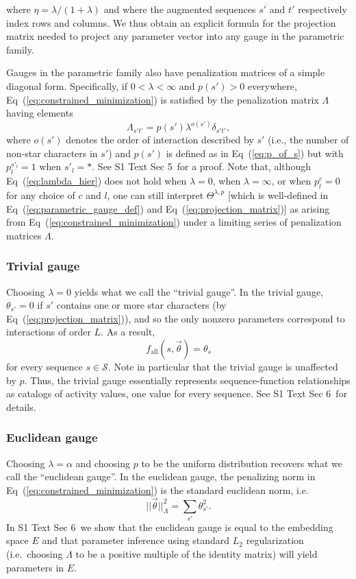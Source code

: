 \documentclass[10pt,letterpaper]{article}
\newcommand{\eq}[1]{Eq\ (\ref{#1})}
\newcommand{\si}[1]{{S1 Text Sec #1}}
\begin{document}
where $\eta = \lambda/(1+\lambda)$ and where the augmented sequences $s'$ and $t'$ respectively index rows and columns. We thus obtain an explicit formula for the projection matrix needed to project any parameter vector into any gauge in the parametric family.

Gauges in the parametric family also have penalization matrices of a simple diagonal form. Specifically, if $0 < \lambda < \infty$ and $p(s')>0$ everywhere, \eq{eq:constrained_minimization} is satisfied by the penalization matrix $\Lambda$ having elements 
\begin{equation}
    \Lambda_{s't'} = p(s') \lambda^{o(s')} \delta_{s't'}, \label{eq:lambda_hier}
\end{equation}
where $o(s')$ denotes the order of interaction described by $s'$ (i.e., the number of non-star characters in $s'$) and $p(s')$ is defined as in \eq{eq:p_of_s} but with $p_l^{s'_l}=1$ when $s'_l=*$. See \si{5}\ for a proof. Note that, although \eq{eq:lambda_hier} does not hold when $\lambda = 0$, when $\lambda = \infty$, or when $p_l^c = 0$ for any choice of $c$ and $l$, one can still interpret $\Theta^{\lambda,p}$ [which is well-defined in \eq{eq:parametric_gauge_def} and \eq{eq:projection_matrix}] as arising from \eq{eq:constrained_minimization} under a limiting series of penalization matrices $\Lambda$. 


\subsubsection*{Trivial gauge}
Choosing $\lambda = 0$ yields what we call the ``trivial gauge''. In the trivial gauge, $\theta_{s'} = 0$ if $s'$ contains one or more star characters (by \eq{eq:projection_matrix}), and so the only nonzero parameters correspond to interactions of order $L$. As a result, 
\begin{equation}
    f_\textrm{all}(s, \vec{\theta}) = \theta_{s}
\end{equation}
for every sequence $s \in \mathcal{S}$. Note in particular that the trivial gauge is unaffected by $p$. Thus, the trivial gauge essentially represents sequence-function relationships as catalogs of activity values, one value for every sequence. See \si{6}\ for details.


\subsubsection*{Euclidean gauge}
Choosing $\lambda = \alpha$ and choosing $p$ to be the uniform distribution recovers what we call the ``euclidean gauge''. In the euclidean gauge, the penalizing norm in \eq{eq:constrained_minimization} is the standard euclidean norm, i.e.
\begin{equation}
    ||\vec{\theta}||^2_\Lambda = \sum_{s'} \theta_{s'}^2.
\end{equation}
In \si{6}\ we show that the euclidean gauge is equal to the embedding space $E$ and that parameter inference using standard $L_2$ regularization (i.e.~choosing $\Lambda$ to be a positive multiple of the identity matrix) will yield parameters in $E$.
\end{document}

